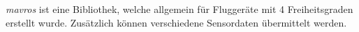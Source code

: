 




































\textit{mavros} ist eine Bibliothek, welche allgemein für Fluggeräte mit 4 Freiheitsgraden erstellt wurde. Zusätzlich können verschiedene Sensordaten übermittelt werden.























